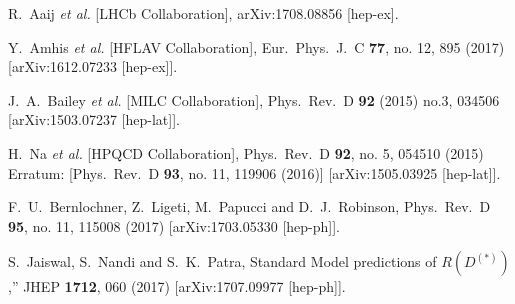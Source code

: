 \documentclass[prd,preprint,superscriptaddress,amsmath,amssymb]{revtex4}
\begin{document}
\begin{thebibliography}{100}
  R.~Aaij {\it et al.} [LHCb Collaboration],
  arXiv:1708.08856 [hep-ex].
  
  
  
  Y.~Amhis {\it et al.} [HFLAV Collaboration],
  Eur.\ Phys.\ J.\ C {\bf 77}, no. 12, 895 (2017)
  [arXiv:1612.07233 [hep-ex]].

  J.~A.~Bailey {\it et al.} [MILC Collaboration],
  Phys.\ Rev.\ D {\bf 92} (2015) no.3,  034506
  [arXiv:1503.07237 [hep-lat]].
 
  H.~Na {\it et al.} [HPQCD Collaboration],
  Phys.\ Rev.\ D {\bf 92}, no. 5, 054510 (2015)
  Erratum: [Phys.\ Rev.\ D {\bf 93}, no. 11, 119906 (2016)]
  [arXiv:1505.03925 [hep-lat]].
  

  F.~U.~Bernlochner, Z.~Ligeti, M.~Papucci and D.~J.~Robinson,
  Phys.\ Rev.\ D {\bf 95}, no. 11, 115008 (2017)
  [arXiv:1703.05330 [hep-ph]].
  
 S.~Jaiswal, S.~Nandi and S.~K.~Patra,
Standard Model predictions of $R(D^{(*)})$,''
 JHEP {\bf 1712}, 060 (2017)
 [arXiv:1707.09977 [hep-ph]].




\end{thebibliography}
\end{document}
